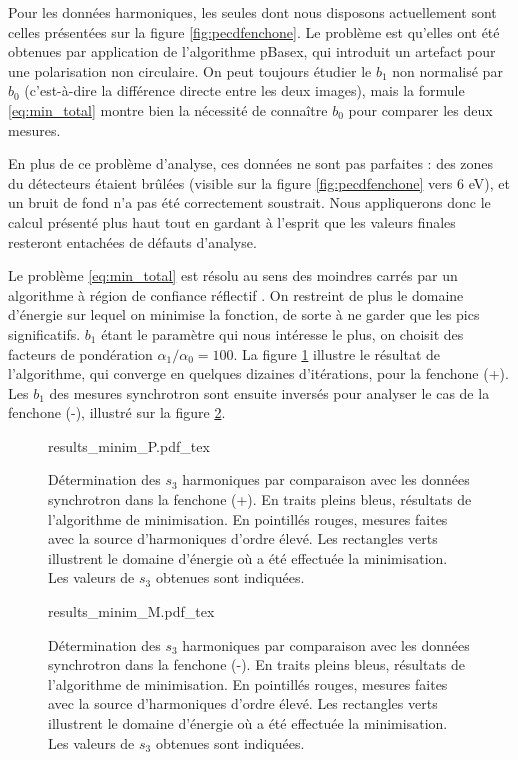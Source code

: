 Pour les données harmoniques, les seules dont nous disposons actuellement sont celles présentées sur la figure \ref{fig:pecdfenchone}. Le problème est qu'elles ont été obtenues par application de l'algorithme pBasex, qui introduit un artefact pour une polarisation non circulaire. On peut toujours étudier le $b_1$ non normalisé par $b_0$ (c'est-à-dire la différence directe entre les deux images), mais la formule \ref{eq:min_total} montre bien la nécessité de connaître $b_0$ pour comparer les deux mesures.

En plus de ce problème d'analyse, ces données ne sont pas parfaites : des zones du détecteurs étaient brûlées (visible sur la figure \ref{fig:pecdfenchone} vers 6 eV), et un bruit de fond n'a pas été correctement soustrait. Nous appliquerons donc le calcul présenté plus haut tout en gardant à l'esprit que les valeurs finales resteront entachées de défauts d'analyse. 

Le problème \ref{eq:min_total} est résolu au sens des moindres carrés par un algorithme à région de confiance réflectif . On restreint de plus le domaine d'énergie sur lequel on minimise la fonction, de sorte à ne garder que les pics significatifs. $b_1$ étant le paramètre qui nous intéresse le plus, on choisit des facteurs de pondération $\alpha_1/\alpha_0 = 100$. La figure \ref{fig:results_minim_P} illustre le résultat de l'algorithme, qui converge en quelques dizaines d'itérations, pour la fenchone (+). Les $b_1$ des mesures synchrotron sont ensuite inversés pour analyser le cas de la fenchone (-), illustré sur la figure \ref{fig:results_minim_M}.

\begin{figure}[!ht]
\centering
\def\svgwidth{0.75\columnwidth}
{results_minim_P.pdf_tex}
\caption{Détermination des $s_3$ harmoniques par comparaison avec les données synchrotron dans la fenchone (+). En traits pleins bleus, résultats de l'algorithme de minimisation. En pointillés rouges, mesures faites avec la source d'harmoniques d'ordre élevé. Les rectangles verts illustrent le domaine d'énergie où a été effectuée la minimisation. Les valeurs de $s_3$ obtenues sont indiquées.}
\label{fig:results_minim_P}
\end{figure}

\begin{figure}[!ht]
\centering
\def\svgwidth{0.75\columnwidth}
{results_minim_M.pdf_tex}
\caption{Détermination des $s_3$ harmoniques par comparaison avec les données synchrotron dans la fenchone (-). En traits pleins bleus, résultats de l'algorithme de minimisation. En pointillés rouges, mesures faites avec la source d'harmoniques d'ordre élevé. Les rectangles verts illustrent le domaine d'énergie où a été effectuée la minimisation. Les valeurs de $s_3$ obtenues sont indiquées.}
\label{fig:results_minim_M}
\end{figure}

